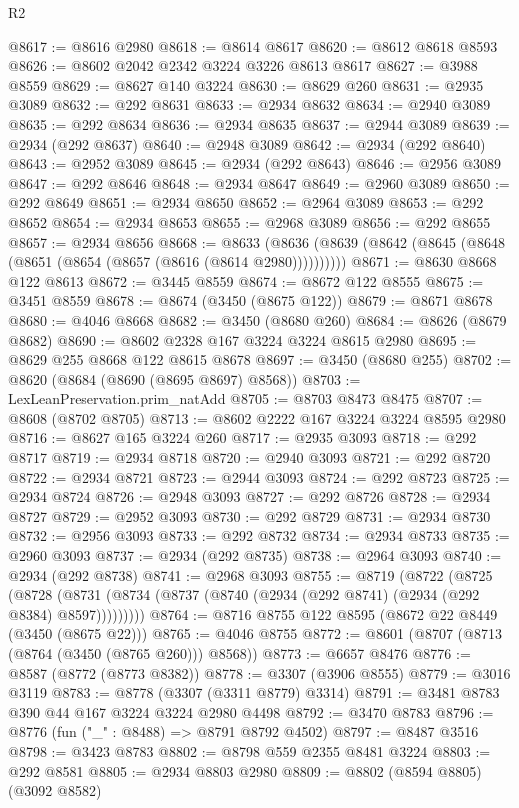 \begin{lexlean}{R2}
\begin{coremodule}
@8617 := @8616 @2980
@8618 := @8614 @8617
@8620 := @8612 @8618 @8593
@8626 := @8602 @2042 @2342 @3224 @3226 @8613 @8617
@8627 := @3988 @8559
@8629 := @8627 @140 @3224
@8630 := @8629 @260
@8631 := @2935 @3089
@8632 := @292 @8631
@8633 := @2934 @8632
@8634 := @2940 @3089
@8635 := @292 @8634
@8636 := @2934 @8635
@8637 := @2944 @3089
@8639 := @2934 (@292 @8637)
@8640 := @2948 @3089
@8642 := @2934 (@292 @8640)
@8643 := @2952 @3089
@8645 := @2934 (@292 @8643)
@8646 := @2956 @3089
@8647 := @292 @8646
@8648 := @2934 @8647
@8649 := @2960 @3089
@8650 := @292 @8649
@8651 := @2934 @8650
@8652 := @2964 @3089
@8653 := @292 @8652
@8654 := @2934 @8653
@8655 := @2968 @3089
@8656 := @292 @8655
@8657 := @2934 @8656
@8668 := @8633 (@8636 (@8639 (@8642 (@8645 (@8648 (@8651 (@8654 (@8657 (@8616 (@8614 @2980))))))))))
@8671 := @8630 @8668 @122 @8613
@8672 := @3445 @8559
@8674 := @8672 @122 @8555
@8675 := @3451 @8559
@8678 := @8674 (@3450 (@8675 @122))
@8679 := @8671 @8678
@8680 := @4046 @8668
@8682 := @3450 (@8680 @260)
@8684 := @8626 (@8679 @8682)
@8690 := @8602 @2328 @167 @3224 @3224 @8615 @2980
@8695 := @8629 @255 @8668 @122 @8615 @8678
@8697 := @3450 (@8680 @255)
@8702 := @8620 (@8684 (@8690 (@8695 @8697) @8568))
@8703 := LexLeanPreservation.prim_natAdd
@8705 := @8703 @8473 @8475
@8707 := @8608 (@8702 @8705)
@8713 := @8602 @2222 @167 @3224 @3224 @8595 @2980
@8716 := @8627 @165 @3224 @260
@8717 := @2935 @3093
@8718 := @292 @8717
@8719 := @2934 @8718
@8720 := @2940 @3093
@8721 := @292 @8720
@8722 := @2934 @8721
@8723 := @2944 @3093
@8724 := @292 @8723
@8725 := @2934 @8724
@8726 := @2948 @3093
@8727 := @292 @8726
@8728 := @2934 @8727
@8729 := @2952 @3093
@8730 := @292 @8729
@8731 := @2934 @8730
@8732 := @2956 @3093
@8733 := @292 @8732
@8734 := @2934 @8733
@8735 := @2960 @3093
@8737 := @2934 (@292 @8735)
@8738 := @2964 @3093
@8740 := @2934 (@292 @8738)
@8741 := @2968 @3093
@8755 := @8719
    (@8722
      (@8725
        (@8728 (@8731 (@8734 (@8737 (@8740 (@2934 (@292 @8741) (@2934 (@292 @8384) @8597)))))))))
@8764 := @8716 @8755 @122 @8595 (@8672 @22 @8449 (@3450 (@8675 @22)))
@8765 := @4046 @8755
@8772 := @8601 (@8707 (@8713 (@8764 (@3450 (@8765 @260))) @8568))
@8773 := @6657 @8476
@8776 := @8587 (@8772 (@8773 @8382))
@8778 := @3307 (@3906 @8555)
@8779 := @3016 @3119
@8783 := @8778 (@3307 (@3311 @8779) @3314)
@8791 := @3481 @8783 @390 @44 @167 @3224 @3224 @2980 @4498
@8792 := @3470 @8783
@8796 := @8776 (fun ("_" : @8488) => @8791 @8792 @4502)
@8797 := @8487 @3516
@8798 := @3423 @8783
@8802 := @8798 @559 @2355 @8481 @3224
@8803 := @292 @8581
@8805 := @2934 @8803 @2980
@8809 := @8802 (@8594 @8805) (@3092 @8582)

\end{coremodule}
\end{lexlean}
